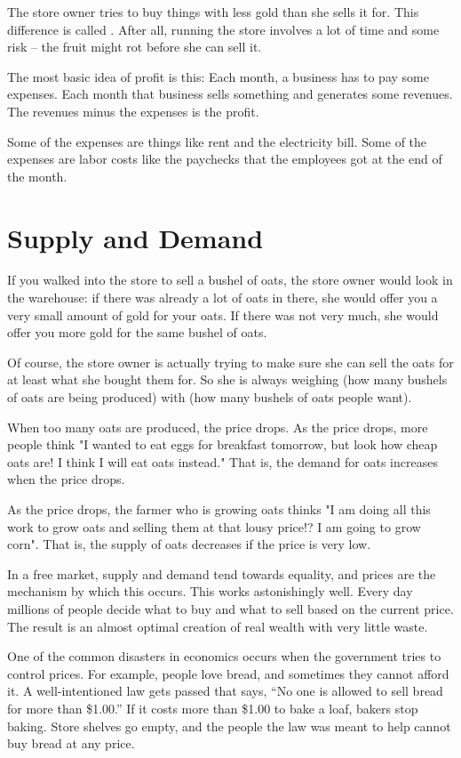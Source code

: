 The store owner tries to buy things with less gold than she sells it for. This difference is called . After all, running the store involves a lot of time and some risk -- the fruit might rot before she can sell it.

The most basic idea of profit is this: Each month, a business has to pay some expenses.  Each month that business sells something and generates some revenues.  The revenues minus the expenses is the profit.

Some of the expenses are things like rent and the electricity bill. Some of the expenses are labor costs like the paychecks that the employees got at the end of the month.

\section{Supply and Demand}

If you walked into the store to sell a bushel of oats, the store owner would look in the warehouse: if there was already a lot of oats in there, she would offer you a very small amount of gold for your oats.  If there was not very much, she would offer you more gold for the same bushel of oats.

Of course, the store owner is actually trying to make sure she can sell the oats for at least what she bought them for.  So she is always weighing  (how many bushels of oats are being produced) with  (how many bushels of oats people want).

When too many oats are produced, the price drops. As the price drops, more people think "I wanted to eat eggs for breakfast tomorrow, but look how cheap oats are! I think I will eat oats instead."  That is, the demand for oats increases when the price drops.

As the price drops, the farmer who is growing oats thinks "I am doing all this work to grow oats and selling them at that lousy price!? I am going to grow corn".  That is, the supply of oats decreases if the price is very low.

In a free market, supply and demand tend towards equality, and prices are the mechanism by which this occurs. This works astonishingly well. Every day millions of people decide what to buy and what to sell based on the current price.  The result is an almost optimal creation of real wealth with very little waste.

One of the common disasters in economics occurs when the government tries to control prices. For example, people love bread, and sometimes they cannot afford it. A well-intentioned law gets passed that says, ``No one is allowed to sell
bread for more than \$1.00.'' If it costs more than \$1.00 to bake a loaf,
bakers stop baking. Store shelves go empty, and the people the law was
meant to help cannot buy bread at any price.

